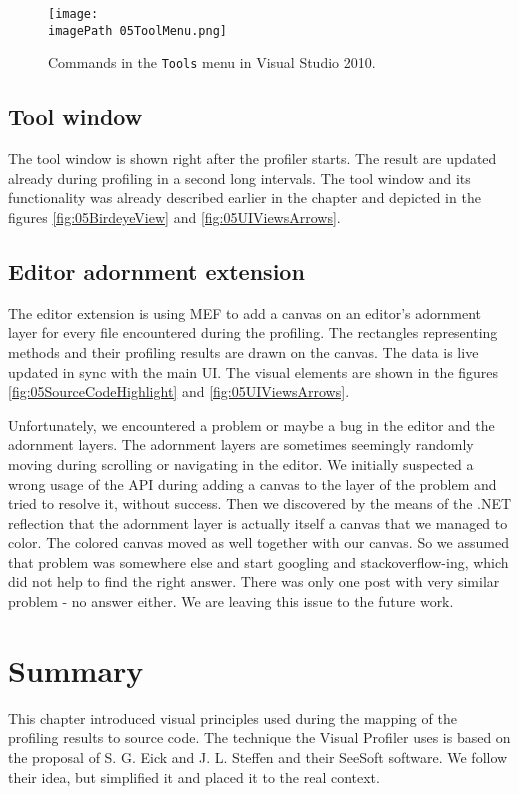  \begin{figure}
	\centering
		\texttt{[image: \\imagePath 05ToolMenu.png]}
		\caption{Commands in the \texttt{Tools} menu in Visual Studio 2010. }
	\label{fig:05ToolMenu}
\end{figure}

\subsection{Tool window}
The tool window is shown right after the profiler starts. The result are updated already during profiling in a second long intervals. The tool window and its functionality was already described earlier in the chapter and depicted in the figures \ref{fig:05BirdeyeView} and \ref{fig:05UIViewsArrows}.

\subsection{Editor adornment extension}
\label{sec:06EditorAdorExt}
The editor extension is using MEF to add a canvas on an editor's adornment layer for every file encountered during the profiling. The rectangles representing methods and their profiling results are drawn on the canvas. The data is live updated in sync with the main UI. The visual elements are shown in the figures \ref{fig:05SourceCodeHighlight} and \ref{fig:05UIViewsArrows}.

Unfortunately, we encountered a problem or maybe a bug in the editor and the adornment layers. The adornment layers are sometimes seemingly randomly moving during scrolling or navigating in the editor. We initially suspected a wrong usage of the API during adding a canvas to the layer of the problem and tried to resolve it, without success. Then we discovered by the means of the .NET reflection that the adornment layer is actually itself a canvas that we managed to color. The colored canvas moved as well together with our canvas. So we assumed that problem was somewhere else and start googling and stackoverflow-ing, which did not help to find the right answer. There was only one post with very similar problem - no answer either. We are leaving this issue to the future work.

\section{Summary}
This chapter introduced visual principles used during the mapping of the profiling results to source code. The technique the Visual Profiler uses is based on the proposal of S. G. Eick and J. L. Steffen and their SeeSoft software. We follow their idea, but simplified it and placed it to the real context.

